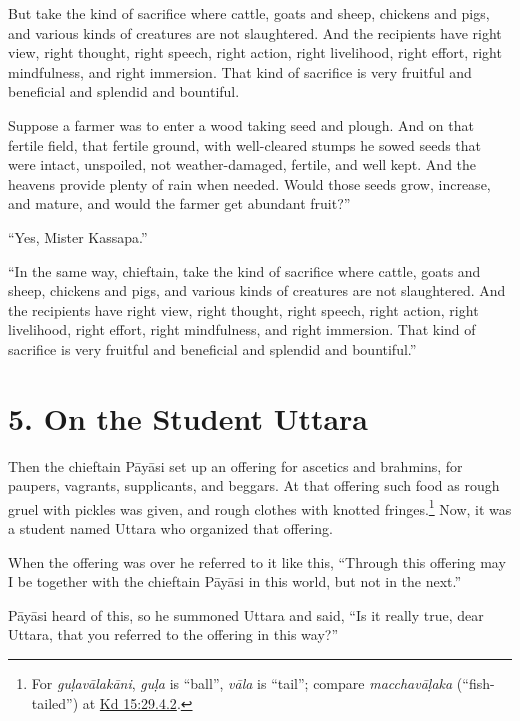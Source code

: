 \documentclass[12pt,openany]{book}%
\begin{document}
But take the kind of sacrifice where cattle, goats and sheep, chickens and pigs, and various kinds of creatures are not slaughtered. And the recipients have right view, right thought, right speech, right action, right livelihood, right effort, right mindfulness, and right immersion. That kind of sacrifice is very fruitful and beneficial and splendid and bountiful. 

Suppose a farmer was to enter a wood taking seed and plough. And on that fertile field, that fertile ground, with well-cleared stumps he sowed seeds that were intact, unspoiled, not weather-damaged, fertile, and well kept. And the heavens provide plenty of rain when needed. Would those seeds grow, increase, and mature, and would the farmer get abundant fruit?” 

“Yes, Mister Kassapa.” 

“In the same way, chieftain, take the kind of sacrifice where cattle, goats and sheep, chickens and pigs, and various kinds of creatures are not slaughtered. And the recipients have right view, right thought, right speech, right action, right livelihood, right effort, right mindfulness, and right immersion. That kind of sacrifice is very fruitful and beneficial and splendid and bountiful.” 

\section*{5. On the Student Uttara }

Then the chieftain \textsanskrit{Pāyāsi} set up an offering for ascetics and brahmins, for paupers, vagrants, supplicants, and beggars. At that offering such food as rough gruel with pickles was given, and rough clothes with knotted fringes.\footnote{For \textit{\textsanskrit{guḷavālakāni}}, \textit{\textsanskrit{guḷa}} is “ball”, \textit{\textsanskrit{vāla}} is “tail”; compare \textit{\textsanskrit{macchavāḷaka}} (“fish-tailed”) at \href{https://suttacentral.net/pli-tv-kd15/en/sujato\#29.4.2}{Kd 15:29.4.2}. } Now, it was a student named Uttara who organized that offering. 

When the offering was over he referred to it like this, “Through this offering may I be together with the chieftain \textsanskrit{Pāyāsi} in this world, but not in the next.” 

\textsanskrit{Pāyāsi} heard of this, so he summoned Uttara and said, “Is it really true, dear Uttara, that you referred to the offering in this way?” 
\end{document}
